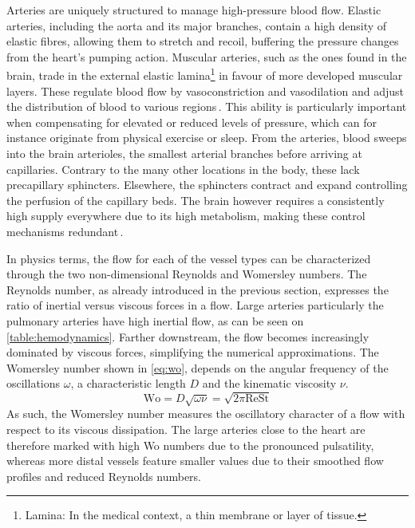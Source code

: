 Arteries are uniquely structured to manage high-pressure blood flow. Elastic arteries, including the aorta and its major branches, contain a high density of elastic fibres, allowing them to stretch and recoil, buffering the pressure changes from the heart's pumping action. Muscular arteries, such as the ones found in the brain, trade in the external elastic lamina\footnote{Lamina: In the medical context, a thin membrane or layer of tissue.} in favour of more developed muscular layers. These regulate blood flow by vasoconstriction and vasodilation and adjust the distribution of blood to various regions\,\cite{Liebeskind2016}. This ability is particularly important when compensating for elevated or reduced levels of pressure, which can for instance originate from physical exercise or sleep. From the arteries, blood sweeps into the brain arterioles, the smallest arterial branches before arriving at capillaries. Contrary to the many other locations in the body, these lack precapillary sphincters. Elsewhere, the sphincters contract and expand controlling the perfusion of the capillary beds. The brain however requires a consistently high supply everywhere due to its high metabolism, making these control mechanisms redundant\,\cite{Liebeskind2016}.

In physics terms, the flow for each of the vessel types can be characterized through the two non-dimensional Reynolds and Womersley numbers. The Reynolds number, as already introduced in the previous section, expresses the ratio of inertial versus viscous forces in a flow. Large arteries particularly the pulmonary arteries have high inertial flow, as can be seen on \autoref{table:hemodynamics}. Farther downstream, the flow becomes increasingly dominated by viscous forces, simplifying the numerical approximations. The Womersley number shown in \autoref{eq:wo}, depends on the angular frequency of the oscillations $\omega$, a characteristic length $D$ and the kinematic viscosity $\nu$.
\begin{equation}
	\text{Wo} = D\sqrt{\omega \nu} = \sqrt{2\pi \text{Re}\text{St}}
	\label{eq:wo}
\end{equation}
As such, the Womersley number measures the oscillatory character of a flow with respect to its viscous dissipation. The large arteries close to the heart are therefore marked with high Wo numbers due to the pronounced pulsatility, whereas more distal vessels feature smaller values due to their smoothed flow profiles and reduced Reynolds numbers.

